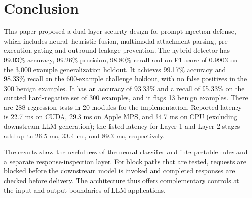 \documentclass[conference]{IEEEtran}
\begin{document}
\section{Conclusion}
This paper proposed a dual-layer security design for prompt-injection defense, which includes neural--heuristic fusion, multimodal attachment parsing, pre-execution gating and outbound leakage prevention. The hybrid detector has 99.03\% accuracy, 99.26\% precision, 98.80\% recall and an F1 score of 0.9903 on the 3,000 example generalization holdout. It achieves 99.17\% accuracy and 98.33\% recall on the 600-example challenge holdout, with no false positives in the 300 benign examples. It has an accuracy of 93.33\% and a recall of 95.33\% on the curated hard-negative set of 300 examples, and it flags 13 benign examples. There are 288 regression tests in 20 modules for the implementation. Reported latency is 22.7 ms on CUDA, 29.3 ms on Apple MPS, and 84.7 ms on CPU (excluding downstream LLM generation); the listed latency for Layer 1 and Layer 2 stages add up to 26.5 ms, 33.4 ms, and 89.3 ms, respectively.

The results show the usefulness of the neural classifier and interpretable rules and a separate response-inspection layer. For block paths that are tested, requests are blocked before the downstream model is invoked and completed responses are checked before delivery. The architecture thus offers complementary controls at the input and output boundaries of LLM applications.
\end{document}
